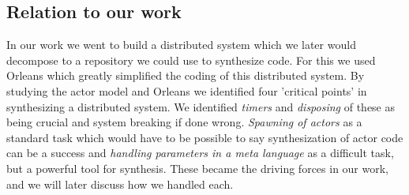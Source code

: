 \subsection{Relation to our work} \label{AMRelation}
In our work we went to build a distributed system which we later would decompose to a repository we could use to synthesize code. For this we used Orleans which greatly simplified the coding of this distributed system. By studying the actor model and Orleans we identified four 'critical points' in synthesizing a distributed system. We identified \textit{timers} and \textit{disposing} of these as being crucial and system breaking if done wrong. \textit{Spawning of actors} as a standard task which would have to be possible to say synthesization of actor code can be a success and \textit{handling parameters in a meta language} as a difficult task, but a powerful tool for synthesis. These became the driving forces in our work, and we will later discuss how we handled each.